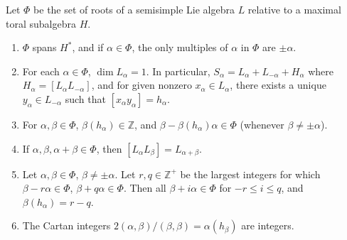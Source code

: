 Let $\Phi$ be the set of roots of a semisimple Lie algebra $L$ relative to a maximal toral subalgebra $H$.
\begin{enumerate}
\item[(a)] $\Phi$ spans $H^*$, and if $\alpha \in \Phi$, the only multiples of $\alpha$ in $\Phi$ are $\pm \alpha$.
\item[(b)] For each $\alpha \in \Phi$, $\dim L_{\alpha} = 1$. In particular, $S_{\alpha} = L_{\alpha} + L_{-\alpha} + H_{\alpha}$ where $H_{\alpha} = [L_{\alpha} L_{-\alpha}]$, and for given nonzero $x_{\alpha} \in L_{\alpha}$, there exists a unique $y_{\alpha} \in L_{-\alpha}$ such that $[x_{\alpha} y_{\alpha}] = h_{\alpha}$.
\item[(c)] For $\alpha, \beta \in \Phi$, $\beta(h_{\alpha}) \in \mathbb{Z}$, and $\beta - \beta(h_{\alpha}) \alpha \in \Phi$ (whenever $\beta \neq \pm \alpha$).
\item[(d)] If $\alpha, \beta, \alpha+\beta \in \Phi$, then $[L_{\alpha} L_{\beta}] = L_{\alpha+\beta}$.
\item[(e)] Let $\alpha, \beta \in \Phi$, $\beta \neq \pm \alpha$. Let $r, q \in \mathbb{Z}^+$ be the largest integers for which $\beta - r\alpha \in \Phi$, $\beta + q\alpha \in \Phi$. Then all $\beta + i\alpha \in \Phi$ for $-r \leq i \leq q$, and $\beta(h_{\alpha}) = r - q$.
\item[(f)] The Cartan integers $2(\alpha, \beta)/(\beta, \beta) = \alpha(h_{\beta})$ are integers.
\end{enumerate}
